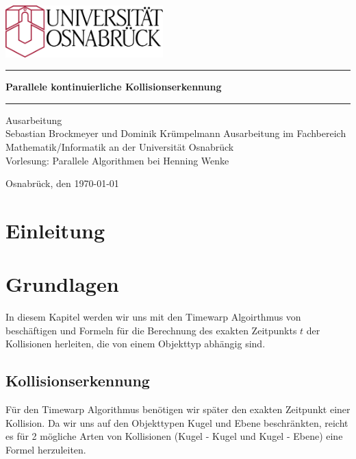 \documentclass[a4paper, 10pt, openright, parskip, chapterprefix]{scrreprt}
\begin{document}
\begin{titlepage}
\thispagestyle{empty}
\vspace{10mm}
\begin{center}
\includegraphics[height=20mm]{unilogo.eps}
\vfill
\rule{\textwidth}{0.1mm}\vspace{5mm}
\Huge\textbf{Parallele kontinuierliche Kollisionserkennung}
\vspace{1mm}\rule{\textwidth}{0.1mm}
\vfill
\Large
Ausarbeitung\\
Sebastian Brockmeyer und Dominik Krümpelmann
\vfill
\normalsize
Ausarbeitung  im Fachbereich Mathematik/Informatik an der Universität Osnabrück \\
Vorlesung: Parallele Algorithmen bei Henning Wenke

Osnabrück, den \today
\end{center}
\end{titlepage}

\newpage
\mbox{}
\thispagestyle{empty}
\chapter*{Einleitung}
\setcounter{page}{1}

\newpage
\mbox{}
\thispagestyle{empty}
\newpage
\clearpage
\setcounter{page}{2}
\tableofcontents
\listoffigures
\newpage



\chapter{Grundlagen}
In diesem Kapitel werden wir uns mit den Timewarp Algoirthmus von~\cite{timewarp} beschäftigen und
Formeln für die Berechnung des exakten Zeitpunkts $t$ der Kollisionen herleiten, die von einem 
Objekttyp abhängig sind.
\section{Kollisionserkennung}

Für den Timewarp Algorithmus benötigen wir später den exakten Zeitpunkt einer Kollision. Da wir uns
auf den Objekttypen Kugel und Ebene beschränkten, reicht es für 2 mögliche Arten von Kollisionen 
(Kugel - Kugel und Kugel - Ebene) eine Formel herzuleiten.\\
\end{document}
